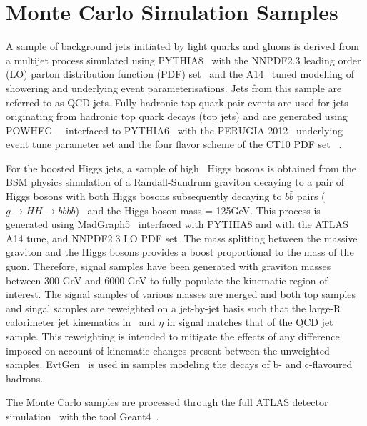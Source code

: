 \section{Monte Carlo Simulation Samples}
\label{sec:mc}
\par A sample of background jets initiated by light quarks and gluons is derived from a multijet process simulated using PYTHIA8~\cite{Sjostrand:2007gs} with the NNPDF2.3 leading order (LO) parton distribution
 function (PDF) set~\cite{Ball:2012cx} and the A14~\cite{ATL-PHYS-PUB-2014-021} tuned modelling of showering and underlying event parameterisations. 
Jets from this sample are referred to as QCD jets. Fully hadronic top quark pair events are used for jets originating from hadronic top quark decays (top jets) and are generated 
using POWHEG~\cite{Frixione:2007vw}~\cite{Nason:2004rx} interfaced to PYTHIA6~\cite{Sjostrand:2006za} with the PERUGIA 2012~\cite{Skands:2010ak} underlying event tune parameter set 
and the four flavor scheme of the CT10 PDF set ~\cite{Gao:2013xoa}.
\par For the boosted Higgs jets, a sample of high \pt~Higgs bosons is obtained from the BSM physics simulation of a Randall-Sundrum graviton decaying to a pair of Higgs bosons with both Higgs bosons 
subsequently decaying to $b\bar{b}$ pairs ($g\rightarrow HH \rightarrow bbbb$) ~\cite{Randall:1999ee}and the Higgs boson mass = 125GeV. This process is generated using MadGraph5~\cite{Alwall:2014hca} 
interfaced with PYTHIA8 and with the ATLAS A14 tune, and NNPDF2.3 LO PDF set. The mass splitting between the massive graviton and the Higgs bosons provides a boost proportional to the mass of the guon. 
Therefore, signal samples have been generated with graviton masses between 300 GeV and 6000 GeV to fully populate the kinematic region of interest. 
The signal samples of various masses are merged and both top samples and singal samples are reweighted on a jet-by-jet basis such that the large-R calorimeter jet kinematics in \pt~and $\eta$ 
in signal matches that of the QCD jet sample. 
This reweighting is intended to mitigate the effects of any difference imposed on account of kinematic changes present between the unweighted samples. 
EvtGen~\cite{Lange:2001uf} is used in samples modeling the decays of b- and c-flavoured hadrons.
\par The Monte Carlo samples are processed through the full ATLAS detector simulation~\cite{Aad:2010ah} with the tool Geant4~\cite{Agostinelli:2002hh}. 

